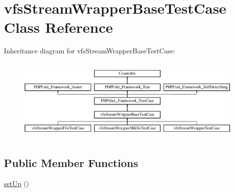 \hypertarget{classorg_1_1bovigo_1_1vfs_1_1vfs_stream_wrapper_base_test_case}{}\section{vfs\+Stream\+Wrapper\+Base\+Test\+Case Class Reference}
\label{classorg_1_1bovigo_1_1vfs_1_1vfs_stream_wrapper_base_test_case}
Inheritance diagram for vfs\+Stream\+Wrapper\+Base\+Test\+Case\+:\begin{figure}[H]
\begin{center}
\leavevmode
\includegraphics[height=4.129793cm]{classorg_1_1bovigo_1_1vfs_1_1vfs_stream_wrapper_base_test_case}
\end{center}
\end{figure}
\subsection*{Public Member Functions}
\begin{DoxyCompactItemize}
\item 
\mbox{\hyperlink{classorg_1_1bovigo_1_1vfs_1_1vfs_stream_wrapper_base_test_case_a0bc688732d2b3b162ffebaf7812e78da}{set\+Up}} ()
\end{DoxyCompactItemize}
